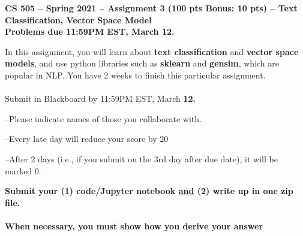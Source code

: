 \documentclass{article}
\begin{document}
        
\begin{center}
{\textbf{CS 505 -- Spring 2021 -- Assignment 3 (100 pts Bonus: 10 pts) --
Text Classification, Vector Space Model}}\\
\large{\textbf{Problems due 11:59PM EST, March 12.}  }
\end{center}

\noindent In this assignment, you will learn about \textbf{text classification}
and \textbf{vector space models}, and use python libraries such as \textbf{sklearn}
and \textbf{gensim}, which are popular in NLP. You have 2 weeks to finish
this particular assignment.

\paragraph{}

Submit in Blackboard by 11:59PM EST, March\textbf{ 12. }

--Please indicate names of those you collaborate with. 

--Every late day will reduce your score by 20%

--After 2 days (i.e., if you submit on the 3rd day after due date), it will
be marked 0. 

\begin{center}

\textbf{Submit your (1) code/Jupyter notebook \uline{and} (2) write up in one zip file.}

\paragraph{}
\textbf{When necessary, you must show how you derive your
answer} 
\end{center}
\end{document}
